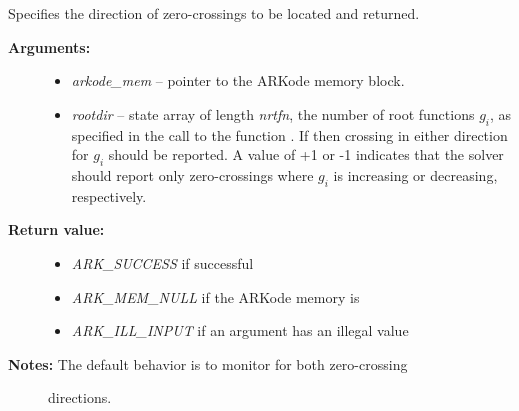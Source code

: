 \documentclass[letterpaper,10pt,english]{sphinxmanual}
\begin{document}
\begin{fulllineitems}
\label{c_interface/User_callable:c.ARKodeSetRootDirection}
Specifies the direction of zero-crossings to be located and returned.
\begin{description}
\item[{\textbf{Arguments:}}] \leavevmode\begin{itemize}
\item {} 
\emph{arkode\_mem} -- pointer to the ARKode memory block.

\item {} 
\emph{rootdir} -- state array of length \emph{nrtfn}, the number of root
functions \(g_i\), as specified in the call to the function
{\hyperref[c_interface/User_callable:c.ARKodeRootInit]{\emph{}}}.  If  then
crossing in either direction for \(g_i\) should be
reported.  A value of +1 or -1 indicates that the solver
should report only zero-crossings where \(g_i\) is
increasing or decreasing, respectively.

\end{itemize}

\item[{\textbf{Return value:}}] \leavevmode\begin{itemize}
\item {} 
\emph{ARK\_SUCCESS} if successful

\item {} 
\emph{ARK\_MEM\_NULL} if the ARKode memory is 

\item {} 
\emph{ARK\_ILL\_INPUT} if an argument has an illegal value

\end{itemize}

\item[{\textbf{Notes:} The default behavior is to monitor for both zero-crossing}] \leavevmode
directions.

\end{description}

\end{fulllineitems}

\end{document}

